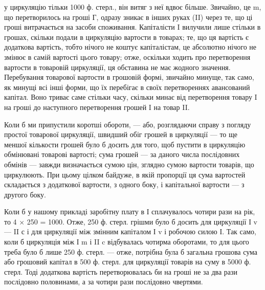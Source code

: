 \parcont{}  %
у циркуляцію тільки 1000 ф. стерл., він витяг з неї вдвоє більше. Звичайно,
це m, що перетворилось на гроші Г, одразу зникає в інших руках
(II) через те, що ці гроші витрачається на засоби споживання. Капіталісти I
вилучили лише стільки в грошах, скільки подали в циркуляцію вартости
в товарах; те, що ця вартість є додаткова вартість, тобто нічого не коштує
капіталістам, це абсолютно нічого не змінює в самій вартості цього товару;
отже, оскільки ходить про перетворення вартости в товаровій циркуляції,
ця обставина не має жодного значення. Перебування товарової вартости
в грошовій формі, звичайно минуще, так само, як минущі всі інші форми,
що їх перебігає в своїх перетвореннях авансований капітал. Воно триває
саме стільки часу, скільки минає від перетворення товару I на гроші до
наступного перетворення грошей I на товар II.

Коли б ми припустили коротші обороти, — або, розглядаючи справу
з погляду простої товарової циркуляції, швидший обіг грошей в циркуляції
— то ще меншої кількости грошей було б досить для того, щоб
пустити в циркуляцію обмінювані товарові вартості; сума грошей — за
даного числа послідовних обмінів — завжди визначається сумою цін, зглядно
сумою вартости товарів, що циркулюють. При цьому цілком байдуже,
в якій пропорції ця сума вартостей складається з додаткової вартости,
з одного боку, і капітальної вартости — з другого боку.

Коли б у нашому прикладі заробітну плату в І сплачувалось чотири
рази на рік, то 4 × 250 = 1000. Отже, 250 ф. стерл. грішми було б
досить для циркуляції І v —  II с і для циркуляції між змінним капіталом
І v і робочою силою І. Так само, коли б циркуляція між І m і
II c відбувалась чотирма оборотами, то для цього треба було б лише
250 ф. стерл. — отже, потрібна була б загальна грошова сума або грошовий
капітал в 500 ф. стерл. для циркуляції товарів на суму в 5000 ф. стерл.
Тоді додаткова вартість перетворювалась би на гроші не за два рази
послідовно половинами, а за чотири рази послідовно чвертями.

